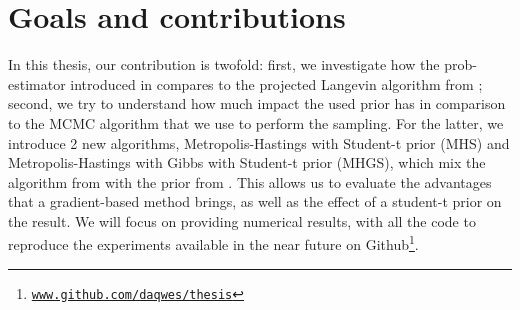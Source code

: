 \documentclass[12pt]{memoir}
\begin{document}







\section{Goals and contributions}\label{section:goals-contributions}
In this thesis, our contribution is twofold: first, we investigate how the prob-estimator introduced in \cite{MA17} compares to the projected Langevin algorithm from \cite{meth:bayesian:Langevin:ACMT2024}; second, we try to understand how much impact the used prior has in comparison to the MCMC algorithm that we use to perform the sampling. For the latter, we introduce 2 new algorithms, Metropolis-Hastings with Student-t prior (MHS) and Metropolis-Hastings with Gibbs with Student-t prior (MHGS), which mix the algorithm from \cite{MA17} with the prior from \cite{meth:bayesian:Langevin:ACMT2024}. This allows us to evaluate the advantages that a gradient-based method brings, as well as the effect of a student-t prior on the result. We will focus on providing numerical results, with all the code to reproduce the experiments available in the near future on Github\footnote{\texttt{\url{www.github.com/daqwes/thesis}}}.
\end{document}
